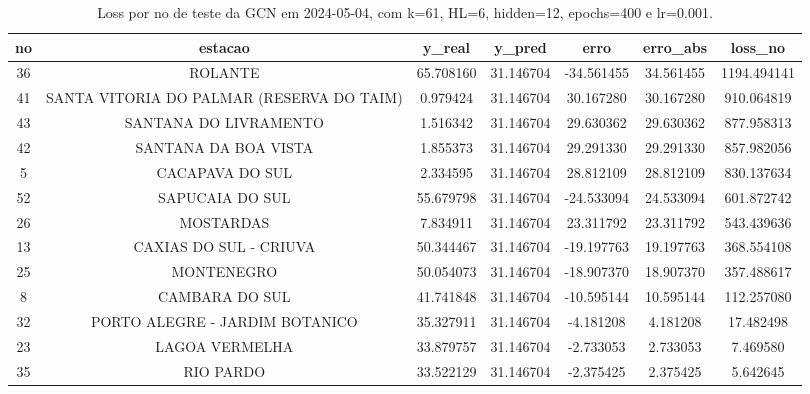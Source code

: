 \begin{table}[h]
\centering
\caption{Loss por no de teste da GCN em 2024-05-04, com k=61, HL=6, hidden=12, epochs=400 e lr=0.001.}
\label{tab:gcn_loss_k61_hl6_h12_e400_d20240504}
\begin{tabular}{ccccccc}
\toprule
no & estacao & y\_real & y\_pred & erro & erro\_abs & loss\_no \\
\midrule
36 & ROLANTE & 65.708160 & 31.146704 & -34.561455 & 34.561455 & 1194.494141 \\
41 & SANTA VITORIA DO PALMAR (RESERVA DO TAIM) & 0.979424 & 31.146704 & 30.167280 & 30.167280 & 910.064819 \\
43 & SANTANA DO LIVRAMENTO & 1.516342 & 31.146704 & 29.630362 & 29.630362 & 877.958313 \\
42 & SANTANA DA BOA VISTA & 1.855373 & 31.146704 & 29.291330 & 29.291330 & 857.982056 \\
5 & CACAPAVA DO SUL & 2.334595 & 31.146704 & 28.812109 & 28.812109 & 830.137634 \\
52 & SAPUCAIA DO SUL & 55.679798 & 31.146704 & -24.533094 & 24.533094 & 601.872742 \\
26 & MOSTARDAS & 7.834911 & 31.146704 & 23.311792 & 23.311792 & 543.439636 \\
13 & CAXIAS DO SUL - CRIUVA & 50.344467 & 31.146704 & -19.197763 & 19.197763 & 368.554108 \\
25 & MONTENEGRO & 50.054073 & 31.146704 & -18.907370 & 18.907370 & 357.488617 \\
8 & CAMBARA DO SUL & 41.741848 & 31.146704 & -10.595144 & 10.595144 & 112.257080 \\
32 & PORTO ALEGRE - JARDIM BOTANICO & 35.327911 & 31.146704 & -4.181208 & 4.181208 & 17.482498 \\
23 & LAGOA VERMELHA & 33.879757 & 31.146704 & -2.733053 & 2.733053 & 7.469580 \\
35 & RIO PARDO & 33.522129 & 31.146704 & -2.375425 & 2.375425 & 5.642645 \\
\bottomrule
\end{tabular}
\end{table}
